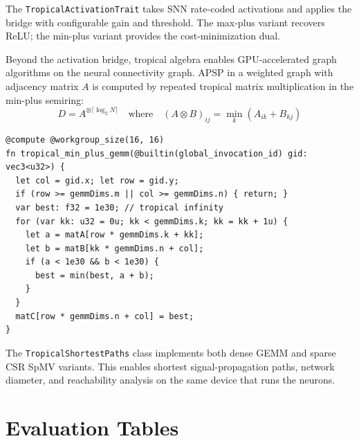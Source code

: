 \documentclass[10pt]{article}
\begin{document}
The \texttt{TropicalActivationTrait} takes SNN rate-coded activations and applies
the bridge with configurable gain and threshold. The max-plus variant recovers
ReLU; the min-plus variant provides the cost-minimization dual.

Beyond the activation bridge, tropical algebra enables GPU-accelerated graph
algorithms on the neural connectivity graph. APSP in a weighted graph with
adjacency matrix $A$ is computed by repeated tropical matrix multiplication in
the min-plus semiring:
\begin{equation}
D = A^{\otimes \lceil \log_2 N \rceil}
\quad\text{where}\quad
(A \otimes B)_{ij} = \min_k (A_{ik} + B_{kj})
\end{equation}

\begin{lstlisting}[caption={Min-plus tropical GEMM kernel (WGSL).}, label=lst:gemm]
@compute @workgroup_size(16, 16)
fn tropical_min_plus_gemm(@builtin(global_invocation_id) gid: vec3<u32>) {
  let col = gid.x; let row = gid.y;
  if (row >= gemmDims.m || col >= gemmDims.n) { return; }
  var best: f32 = 1e30; // tropical infinity
  for (var kk: u32 = 0u; kk < gemmDims.k; kk = kk + 1u) {
    let a = matA[row * gemmDims.k + kk];
    let b = matB[kk * gemmDims.n + col];
    if (a < 1e30 && b < 1e30) {
      best = min(best, a + b);
    }
  }
  matC[row * gemmDims.n + col] = best;
}
\end{lstlisting}

The \texttt{TropicalShortestPaths} class implements both dense GEMM and sparse
CSR SpMV variants. This enables shortest signal-propagation paths, network
diameter, and reachability analysis on the same device that runs the neurons.

\section{Evaluation Tables}
\label{supp:evaluation-tables}
\end{document}
